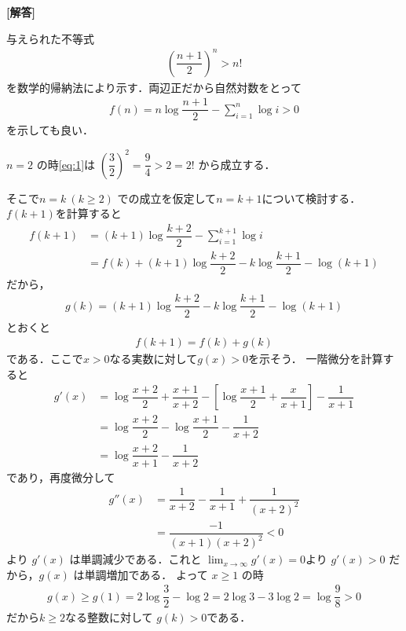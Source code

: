 \documentclass[../../main.tex]{subfiles}
\begin{document}
\begin{oframed}
  
\end{oframed}

{\bf [解答]}

与えられた不等式
\begin{align}
  \left(\dfrac{n+1}{2}\right)^n > n! \label{eq:1}
\end{align}
を数学的帰納法により示す．両辺正だから自然対数をとって
\begin{align}
  f(n) = n\log \dfrac{n+1}{2} - \sum_{i=1}^n \log i > 0 \label{eq:2}
\end{align}
を示しても良い．

$n=2$ の時\cref{eq:1}は $\left(\dfrac{3}{2}\right)^2 = \dfrac{9}{4} > 2 = 2!$ から成立する．

そこで$n=k \ (k \ge 2)$ での成立を仮定して$n=k+1$について検討する．
$f(k+1)$を計算すると
\begin{align}
  f(k+1)
  &= (k+1)\log \dfrac{k+2}{2} - \sum_{i=1}^{k+1} \log i \\
  &= f(k) + (k+1)\log\dfrac{k+2}{2} - k\log\dfrac{k+1}{2} - \log(k+1) \label{eq:3}
\end{align}
だから，
\begin{align}
  g(k) = (k+1)\log\dfrac{k+2}{2} - k\log\dfrac{k+1}{2} - \log(k+1) \label{eq:4}
\end{align}
とおくと
\begin{align}
  f(k+1) = f(k) + g(k) \label{eq:5}
\end{align}
である．ここで$x>0$なる実数に対して$g(x)>0$を示そう．
一階微分を計算すると
\begin{align}
  g'(x)
  &= \log\dfrac{x+2}{2} + \dfrac{x+1}{x+2} - \left[ \log\dfrac{x+1}{2} + \dfrac{x}{x+1} \right] - \dfrac{1}{x+1} \\
  &= \log\dfrac{x+2}{2} - \log\dfrac{x+1}{2} - \dfrac{1}{x+2} \\
  &= \log \dfrac{x+2}{x+1} - \dfrac{1}{x+2}
\end{align}
であり，再度微分して
\begin{align}
  g''(x)
  &= \dfrac{1}{x+2} - \dfrac{1}{x+1} + \dfrac{1}{(x+2)^2} \\
  &= \dfrac{-1}{(x+1)(x+2)^2} < 0
\end{align}
より $g'(x)$ は単調減少である．これと $\lim_{x\to\infty} g'(x) = 0$より
$g'(x) > 0$ だから，$g(x)$ は単調増加である． よって $x \ge 1$ の時
\begin{align}
  g(x) \ge g(1) = 2\log\dfrac{3}{2} - \log 2 = 2\log 3 - 3\log 2 = \log\dfrac{9}{8} > 0
\end{align}
だから$k \ge 2$なる整数に対して $g(k) > 0$である．
\end{document}

